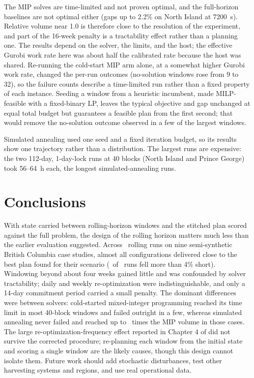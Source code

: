 The MIP solves are time-limited and not proven optimal, and the full-horizon baselines are not
optimal either (gaps up to 2.2\% on North Island at 7200~s). Relative volume near 1.0 is therefore
close to the resolution of the experiment, and part of the 16-week penalty is a tractability
effect rather than a planning one. The results depend on the solver, the limits, and the host; the
effective Gurobi work rate here was about half the calibrated rate because the host was shared.
Re-running the cold-start MIP arm alone, at a somewhat higher Gurobi work rate, changed the per-run
outcomes (no-solution windows rose from 9 to 32), so the failure counts describe a time-limited run
rather than a fixed property of each instance.
Seeding a window from a heuristic incumbent, made MILP-feasible with a fixed-binary LP, leaves the
typical objective and gap unchanged at equal total budget but guarantees a feasible plan from the
first second; that would remove the no-solution outcome observed in a few of the largest windows.

Simulated annealing used one seed and a fixed iteration budget, so its results show one trajectory
rather than a distribution. The largest runs are expensive: the two 112-day, 1-day-lock runs at 40
blocks (North Island and Prince George) took 56--64~h each, the longest simulated-annealing runs.

\section{Conclusions}

With state carried between rolling-horizon windows and the stitched plan scored against the full
problem, the design of the rolling horizon matters much less than the earlier evaluation suggested.
Across \NRollingRuns\ rolling runs on nine semi-synthetic British Columbia case studies, almost all
configurations delivered close to the best plan found for their scenario
(\NRunsBeyondFourPct\ of \NRollingRuns\ runs fell more than 4\% short). Windowing beyond
about four weeks gained little and was confounded by solver tractability; daily and weekly
re-optimization were indistinguishable, and only a 14-day commitment period carried a small
penalty. The dominant differences were between solvers: cold-started mixed-integer programming
reached its time limit in most 40-block windows and failed outright in a few, whereas simulated
annealing never failed and reached up to \RatioSAMIPMax\ times the MIP volume in those cases. The large re-optimization-frequency
effect reported in Chapter 4 of \citet{jaffray2026thesis} did not survive the corrected procedure;
re-planning each window from the initial state and scoring a single window are the likely causes,
though this design cannot isolate them. Future work should add stochastic
disturbances, test other harvesting systems and regions, and use real operational data.
